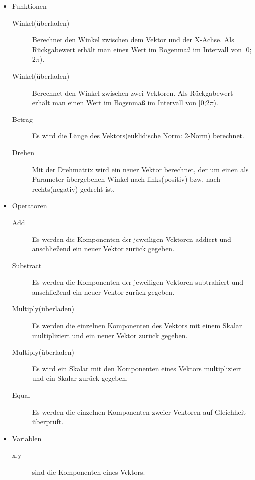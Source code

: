 \begin{itemize}
	\item Funktionen
	\begin{description}
		\item[Winkel(überladen)] Berechnet den Winkel zwischen dem Vektor und der X-Achse. Als Rückgabewert erhält man einen Wert im Bogenmaß im Intervall von [0;$2\pi$).
		\item[Winkel(überladen)] Berechnet den Winkel zwischen zwei Vektoren. Als Rückgabewert erhält man einen Wert im Bogenmaß im Intervall von [0;$2\pi$). 
		\item[Betrag] Es wird die Länge des Vektors(euklidische Norm: 2-Norm) berechnet.
		\item[Drehen] Mit der Drehmatrix wird ein neuer Vektor berechnet, der um einen als Parameter übergebenen Winkel nach links(positiv) bzw. nach rechts(negativ) gedreht ist. 
	\end{description}
	\item Operatoren
	\begin{description}
		\item[Add] Es werden die Komponenten der jeweiligen Vektoren addiert und anschließend ein neuer Vektor zurück gegeben.
		\item[Substract] Es werden die Komponenten der jeweiligen Vektoren subtrahiert und anschließend ein neuer Vektor zurück gegeben.
		\item[Multiply(überladen)] Es werden die einzelnen Komponenten des Vektors mit einem Skalar multipliziert und ein neuer Vektor zurück gegeben.
		\item[Multiply(überladen)] Es wird ein Skalar mit den Komponenten eines Vektors multipliziert und ein Skalar zurück gegeben.
		\item[Equal] Es werden die einzelnen Komponenten zweier Vektoren auf Gleichheit überprüft.
	\end{description}
	\item Variablen
	\begin{description}
		\item[x,y] sind die Komponenten eines Vektors.
	\end{description}
\end{itemize}
